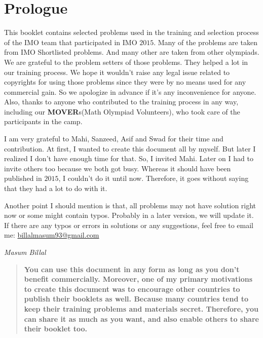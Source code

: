 \documentclass{subfile}
\begin{document}
	\section*{Prologue}
	\large This booklet contains selected problems used in the training and selection process of the IMO team that participated in IMO $2015$. Many of the problems are taken from IMO Shortlisted problems. And many other are taken from other olympiads. We are grateful to the problem setters of those problems. They helped a lot in our training process. We hope it wouldn't raise any legal issue related to copyrights for using those problems since they were by no means used for any commercial gain. So we apologize in advance if it's any inconvenience for anyone. Also, thanks to anyone who contributed to the training process in any way, including our \textbf{MOVER}s(Math Olympiad Volunteers), who took care of the participants in the camp.
	
	I am very grateful to Mahi, Sanzeed, Asif and Swad for their time and contribution. At first, I wanted to create this document all by myself. But later I realized I don't have enough time for that. So, I invited Mahi. Later on I had to invite others too because we both got busy. Whereas it should have been published in $2015$, I couldn't do it until now. Therefore, it goes without saying that they had a lot to do with it.
	
	Another point I should mention is that, all problems may not have solution right now or some might contain typos. Probably in a later version, we will update it. If there are any typos or errors in solutions or any suggestions, feel free to email me: \url{billalmasum93@gmail.com}
	
	\begin{flushright}
		{\it Masum Billal}
	\end{flushright}
	\titlepage
	
	\begin{center}
		\begin{quote}
			\textbf{You can use this document in any form as long as you don't benefit commercially. Moreover, one of my primary motivations to create this document was to encourage other countries to publish their booklets as well. Because many countries tend to keep their training problems and materials secret. Therefore, you can share it as much as you want, and also enable others to share their booklet too.}
		\end{quote}
	\end{center}\newpage
\end{document}
